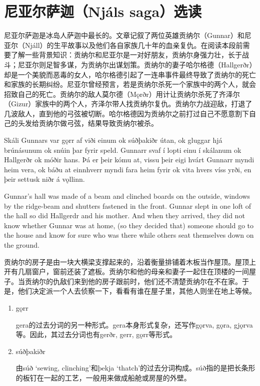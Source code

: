 \section{尼亚尔萨迦（Njáls saga）选读}
尼亚尔萨迦是冰岛人萨迦中最长的。文章记叙了两位英雄贡纳尔（Gunnar）和尼亚尔（Njáll）的生平故事以及他们各自家族几十年的血亲复仇。在阅读本段前需要了解一些背景知识：贡纳尔和尼亚尔是一对好朋友，贡纳尔身强力壮，长于战斗；尼亚尔则足智多谋，为贡纳尔出谋划策。贡纳尔的妻子哈尔格德（Hallgerðr）却是一个美貌而恶毒的女人，哈尔格德引起了一连串事件最终导致了贡纳尔的死亡和家族的长期纠纷。尼亚尔曾经预言，若是贡纳尔杀死一个家族中的两个人，就会招致自己的死亡。贡纳尔的敌人莫尔德（Mǫrðr）用计让贡纳尔杀死了齐泽尔（Gizur）家族中的两个人，齐泽尔带人找贡纳尔复仇。贡纳尔力战迎敌，打退了几波敌人，直到他的弓弦被切断。哈尔格德因为贡纳尔之前打过自己不愿意割下自己的头发给贡纳尔做弓弦，结果导致贡纳尔被杀。
\begin{paracol}{2}
  Skáli Gunnars var gǫrr af viði einum ok súðþakiðr útan, ok gluggar hjá brúnásunum ok snúin þar fyrir speld. Gunnarr svaf í lopti einu í skálanum ok Hallgerðr ok móðir hans. Þá er þeir kómu at, vissu þeir eigi hvárt Gunnarr myndi heim vera, ok báðu at einnhverr myndi fara heim fyrir ok vita hvers víss yrði, en þeir settusk niðr á vǫllinn.

  \switchcolumn

  Gunnar's hall was made of a beam and clinched boards on the outside, windows by the ridge-beam and shutters fastened in the front. Gunnar slept in one loft of the hall so did Hallgerdr and his mother. And when they arrived, they did not know whether Gunnar was at home, (so they decided that) someone should go to the house and know for sure who was there while others seat themselves down on the ground.
\end{paracol}
\begin{translation*}{}
  贡纳尔的房子是由一块大横梁支撑起来的，沿着衡量排铺着木板当作屋顶。屋顶上开有几扇窗户，窗前还装了遮板。贡纳尔和他的母亲和妻子一起住在顶楼的一间屋子。当贡纳尔的仇敌们来到他的房子跟前时，他们还不清楚贡纳尔在不在家。于是，他们决定派一个人去侦察一下，看看有谁在屋子里，其他人则坐在地上等候。
\end{translation*}
\begin{grammar*}{}
  \begin{enumerate}[leftmargin=*]
    \item gǫrr

          gera的过去分词的另一种形式。gera本身形式复杂，还写作gǫrva, gǫra, gjǫrva等。因此，其过去分词也有gerðr, gerr, gǫrr等形式。

    \item súðþakiðr

          由súð `sewing, clinching'和þekja `thatch'的过去分词构成。súð指的是把长条形的板钉在一起的工艺，一般用来做成船舱或房屋的外壁。
  \end{enumerate}
\end{grammar*}

